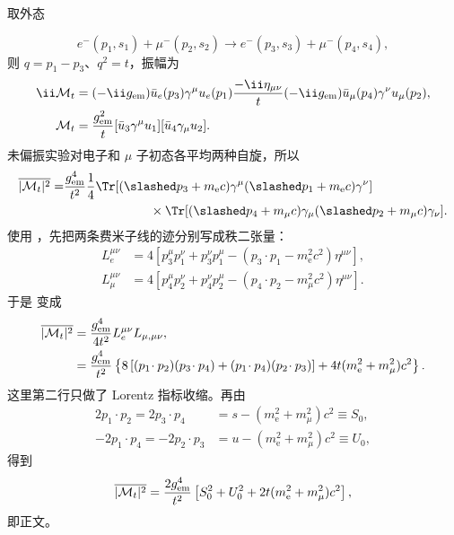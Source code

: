 \begin{derivation}[电子与缪子的散射振幅平方]
取外态

\begin{equation*}
 e^-(p_1,s_1)+\mu^-(p_2,s_2)
 \to e^-(p_3,s_3)+\mu^-(p_4,s_4),
\end{equation*}
则 $q=p_1-p_3$、$q^2=t$，振幅为
\begin{align*}
 \ii\mathcal M_t
 &=(-\ii g_{\rm em})\bar u_e(p_3)\gamma^\mu u_e(p_1)
 \frac{-\ii\eta_{\mu\nu}}{t}
 (-\ii g_{\rm em})\bar u_\mu(p_4)\gamma^\nu u_\mu(p_2),\\
 \mathcal M_t
 &=\frac{g_{\rm em}^2}{t}
 [\bar u_3\gamma^\mu u_1]
 [\bar u_4\gamma_\mu u_2].
 \end{align*}
未偏振实验对电子和 $\mu$ 子初态各平均两种自旋，所以
\begin{align*}
 \overline{|\mathcal M_t|^2}
 =&\frac{g_{\rm em}^4}{t^2}\frac14
 \Tr[(\slashed p_3+m_{\mathrm e} c)\gamma^\mu(\slashed p_1+m_{\mathrm e} c)\gamma^\nu]\nonumber\\
 &\hspace{2.4cm}\times
 \Tr[(\slashed p_4+m_\mu c)\gamma_\mu(\slashed p_2+m_\mu c)\gamma_\nu].
 \end{align*}
使用 ，先把两条费米子线的迹分别写成秩二张量：
\begin{align*}
 L_e^{\mu\nu}
 &=4\left[
 p_3^\mu p_1^\nu+p_3^\nu p_1^\mu
 -(p_3\!\cdot p_1-m_{\mathrm e}^2c^2)\eta^{\mu\nu}
 \right],\\
 L_\mu^{\mu\nu}
 &=4\left[
 p_4^\mu p_2^\nu+p_4^\nu p_2^\mu
 -(p_4\!\cdot p_2-m_\mu^2c^2)\eta^{\mu\nu}
 \right].
 \end{align*}
于是  变成
\begin{align*}
 \overline{|\mathcal M_t|^2}
 &=\frac{g_{\rm em}^4}{4t^2}L_e^{\mu\nu}L_{\mu,\mu\nu},\\
 &=\frac{g_{\rm em}^4}{t^2}\left\{
 8\left[(p_1\!\cdot p_2)(p_3\!\cdot p_4)
 +(p_1\!\cdot p_4)(p_2\!\cdot p_3)\right]
 +4t(m_{\mathrm e}^2+m_\mu^2)c^2
 \right\}.
 \end{align*}
这里第二行只做了 Lorentz 指标收缩。再由
\begin{align*}
 2p_1\!\cdot p_2=2p_3\!\cdot p_4
 &=s-(m_{\mathrm e}^2+m_\mu^2)c^2\equiv S_0,\\
 -2p_1\!\cdot p_4=-2p_2\!\cdot p_3
 &=u-(m_{\mathrm e}^2+m_\mu^2)c^2\equiv U_0,
\end{align*}
得到
\begin{align*}
 \overline{|\mathcal M_t|^2}
 =\frac{2g_{\rm em}^4}{t^2}
 \left[
 S_0^2+U_0^2+2t(m_{\mathrm e}^2+m_\mu^2)c^2
 \right],
\end{align*}
即正文。


\end{derivation}

